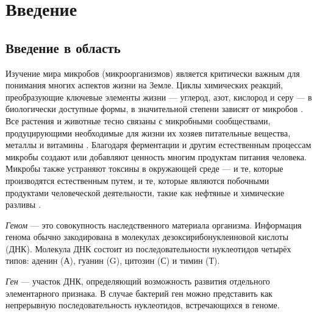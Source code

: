 \documentclass{spbau-diploma}
\begin{document}


\maketitle


\tableofcontents


\section*{Введение}

\subsection{Введение в область} 

Изучение мира микробов (микроорганизмов) является критически важным для понимания многих аспектов жизни на Земле. Циклы химических реакций, преобразующие ключевые элементы жизни --- углерод, азот, кислород и серу --- в биологически доступные формы, в значительной степени зависят от микробов \cite{metabook}. Все растения и животные тесно связаны с микробными сообществами, продуцирующими необходимые для жизни их хозяев питательные вещества, металлы и витамины \cite{microbes_animals}. Благодаря ферментации и другим естественным процессам микробы создают или добавляют ценность многим продуктам питания человека. Микробы также устраняют токсины в окружающей среде --- и те, которые производятся естественным путем, и те, которые являются побочными продуктами человеческой деятельности, такие как нефтяные и химические разливы \cite{oil}. 

\textit{Геном} --- это совокупность наследственного материала организма. Информация генома обычно закодирована в молекулах дезоксирибонуклеиновой кислоты (ДНК). Молекула ДНК состоит из последовательности нуклеотидов четырёх типов: аденин (А), гуанин (G), цитозин (С) и тимин (Т).

\textit{Ген} --- участок ДНК, определяющий возможность развития отдельного элементарного признака. В случае бактерий ген можно представить как непрерывную последовательность нуклеотидов, встречающихся в геноме.
\end{document}
